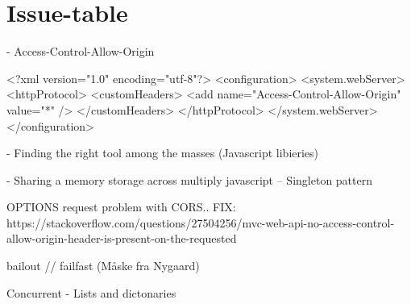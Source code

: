 \section{Issue-table}


- Access-Control-Allow-Origin

<?xml version="1.0" encoding="utf-8"?>
<configuration>
 <system.webServer>
   <httpProtocol>
     <customHeaders>
       <add name="Access-Control-Allow-Origin" value="*" />
     </customHeaders>
   </httpProtocol>
 </system.webServer>
</configuration>



- Finding the right tool among the masses (Javascript libieries)


- Sharing a memory storage across multiply javascript -- Singleton pattern



OPTIONS request problem with CORS..
FIX: https://stackoverflow.com/questions/27504256/mvc-web-api-no-access-control-allow-origin-header-is-present-on-the-requested


bailout // failfast (Måske fra Nygaard)

Concurrent - Lists and dictonaries